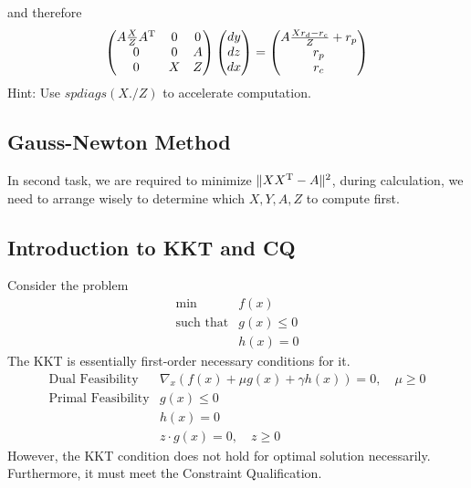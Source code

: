 and therefore
\[
\begin{pmatrix}
A\frac{X}{Z} A^{\mathrm T}&0&0\\0&0&A\\0&X&Z
\end{pmatrix}\begin{pmatrix}
dy\\dz\\dx
\end{pmatrix}=\begin{pmatrix}
A\frac{Xr_d-r_c}{Z}+r_p\\r_p\\r_c
\end{pmatrix}
\]
Hint: Use $spdiags(X./Z)$ to accelerate computation.

\subsection{Gauss-Newton Method}
In second task, we are required to minimize $\|XX^{\mathrm T}-A\|^2$, during calculation, we need to arrange wisely to determine which $X,Y,A,Z$ to compute first.
\subsection{Introduction to KKT and CQ}
Consider the problem
\[
\begin{array}{ll}
\min&f(x)\\
\mbox{such that}&g(x)\le0\\
&h(x)=0
\end{array}
\]
The KKT is essentially first-order necessary conditions for it.
\[
\begin{array}{ll}
\mbox{Dual Feasibility}&\nabla_x(f(x)+\mu g(x)+\gamma h(x))=0,\quad \mu\ge0\\
\mbox{Primal Feasibility}&g(x)\le0\\
&h(x)=0\\
&z\cdot g(x)=0,\quad z\ge0
\end{array}
\]
However, the KKT condition does not hold for optimal solution necessarily. Furthermore, it must meet the Constraint Qualification.

